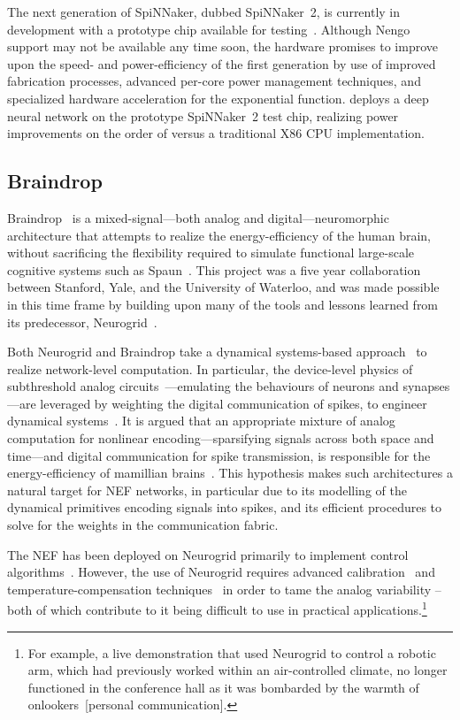 The next generation of SpiNNaker, dubbed SpiNNaker~2, is currently in development with a prototype chip available for testing~\citep{liu2018memory}.
Although Nengo support may not be available any time soon, the hardware promises to improve upon the speed- and power-efficiency of the first generation by use of improved fabrication processes, advanced per-core power management techniques, and specialized hardware acceleration for the exponential function.
\citet{liu2018memory} deploys a deep neural network on the prototype SpiNNaker~2 test chip, realizing power improvements on the order of  versus a traditional X86 CPU implementation.

\subsection{Braindrop}

Braindrop~\citep{braindrop2019} is a mixed-signal---both analog and digital---neuromorphic architecture that attempts to realize the energy-efficiency of the human brain, without sacrificing the flexibility required to simulate functional large-scale cognitive systems such as Spaun~\citep{eliasmith2012}.
This project was a five year collaboration between Stanford, Yale, and the University of Waterloo, and was made possible in this time frame 
by building upon many of the tools and lessons learned from its predecessor, Neurogrid~\citep{neurogrid2014}. 

Both Neurogrid and Braindrop take a dynamical systems-based approach~\citep{arthur2011silicon, gao2012dynamical} to realize network-level computation.
In particular, the device-level physics of subthreshold analog circuits~\citep{andreou1991current}---emulating the behaviours of neurons and synapses---are leveraged by weighting the digital communication of spikes, to engineer dynamical systems~\citep{dethier2011brain}.
It is argued that an appropriate mixture of analog computation for nonlinear encoding---sparsifying signals across both space and time---and digital communication for spike transmission, is responsible for the energy-efficiency of mamillian brains~\citep{boahen2017neuromorph}.
This hypothesis makes such architectures a natural target for NEF networks, in particular due to its modelling of the dynamical primitives encoding signals into spikes, and its efficient procedures to solve for the weights in the communication fabric.

The NEF has been deployed on Neurogrid primarily to implement control algorithms~\citep{dethier2011brain, choudhary2012silicon, menon2014controlling}.
However, the use of Neurogrid requires advanced calibration~\citep{kauderer2017calibrating} and temperature-compensation techniques~\citep{abrams2017} in order to tame the analog variability -- both of which contribute to it being difficult to use in practical applications.\footnote{
For example, a live demonstration that used Neurogrid to control a robotic arm, which had previously worked within an air-controlled climate, no longer functioned in the conference hall as it was bombarded by the warmth of onlookers~[personal communication].}


